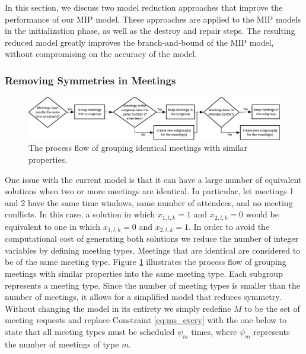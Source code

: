 In this section, we discuss two model reduction approaches that improve the performance of our MIP model. These approaches are applied to the MIP models in the initialization phase, as well as the destroy and repair steps. The resulting reduced model greatly improves the branch-and-bound of the MIP model, without compromising on the accuracy of the model.


\subsubsection{Removing Symmetries in Meetings}

\begin{figure}
	\centering
		\includegraphics[width=1\linewidth]{figs/lns_mtype.jpg}
	\caption{The process flow of grouping identical meetings with similar properties.}
	\label{fig:mtype}
\end{figure}

One issue with the current model is that it can have a large number of equivalent solutions when two or more meetings are identical. In particular, let meetings 1 and 2 have the same time windows, same number of attendees, and no meeting conflicts. In this case, a solution in which $x_{1,l,k} = 1$ and $x_{2,l,k} = 0$ would be equivalent to one in which $x_{1,l,k} = 0$ and $x_{2,l,k} = 1$. In order to avoid the computational cost of generating both solutions we reduce the number of integer variables by defining meeting types. Meetings that are identical are considered to be of the same meeting type. Figure \ref{fig:mtype} illustrates the process flow of grouping meetings with similar properties into the same meeting type. Each subgroup represents a meeting type. Since the number of meeting types is smaller than the number of meetings, it allows for a simplified model that reduces symmetry. Without changing the model in its entirety we simply redefine $M$ to be the set of meeting requests and replace Constraint \eqref{eq:ms_every} with the one below to state that all meeting types must be scheduled $\psi_m$ times, where $\psi_m$ represents the number of meetings of type $m$.

